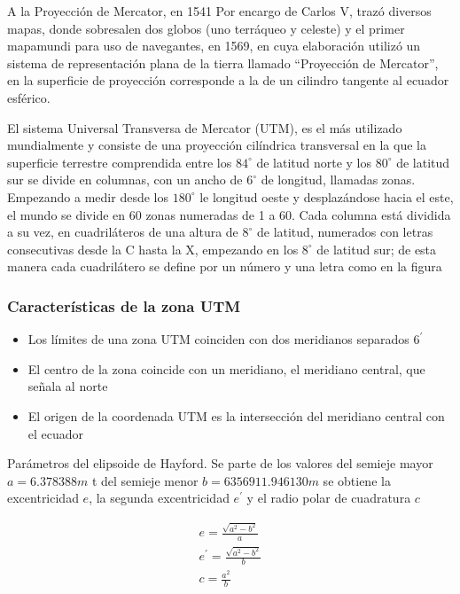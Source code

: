 A la Proyección de Mercator, en 1541 Por encargo de Carlos V, trazó diversos mapas, donde sobresalen dos globos (uno terráqueo y celeste) y el primer mapamundi para uso de navegantes, en 1569, en cuya elaboración utilizó un sistema de representación plana de la tierra llamado ``Proyección de Mercator'', en la superficie de proyección corresponde a la de un cilindro tangente al ecuador esférico.

El sistema Universal Transversa de Mercator (UTM), es el más utilizado mundialmente y consiste de una proyección cilíndrica transversal en la que la superficie terrestre comprendida entre los $84^{\circ}$ de latitud norte y los $80^{\circ}$ de latitud sur se divide en columnas, con un ancho de $6^{\circ}$ de longitud, llamadas zonas. Empezando a medir desde los $180^{\circ}$ le longitud oeste y desplazándose hacia el este, el mundo se divide en 60 zonas numeradas de 1 a 60. Cada columna está dividida a su vez, en cuadriláteros de una altura de $8^{\circ}$ de latitud, numerados con letras consecutivas desde la C hasta la X, empezando en los $8^{\circ}$ de latitud sur; de esta manera cada cuadrilátero se define por un número y una letra como en la figura 


\subsubsection{Características de la zona UTM}

\begin{itemize}
    \item Los límites de una zona UTM coinciden con dos meridianos separados $6^{\prime}$ 
    \item El centro de la zona coincide con un meridiano, el meridiano central, que señala al norte
    \item El origen de la coordenada UTM es la intersección del meridiano central con el ecuador
\end{itemize}

Parámetros del elipsoide de Hayford. Se parte de los valores del semieje mayor $a=6.378388m$ t del semieje menor $b=6356911.946130m$  se obtiene la excentricidad $e$, la segunda excentricidad $e^{\prime}$ y el radio polar de cuadratura $c$

\begin{align}
    e=\frac{\sqrt{a^2-b^2}}{a}\\
    e^{\prime}=\frac{\sqrt{a^2-b^2}}{b}\\
    c=\frac{a^2}{b}
\end{align}

